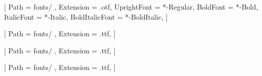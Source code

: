 \setmainfont{STIXTwoText}[
    Path = fonts/ ,
    Extension = .otf,
    UprightFont = *-Regular,
    BoldFont = *-Bold,
    ItalicFont = *-Italic,
    BoldItalicFont = *-BoldItalic,
]

[
    Path = fonts/ ,
    Extension = .ttf,
]

[
    Path = fonts/ ,
    Extension = .ttf,
]

[
    Path = fonts/ ,
    Extension = .ttf,
]
